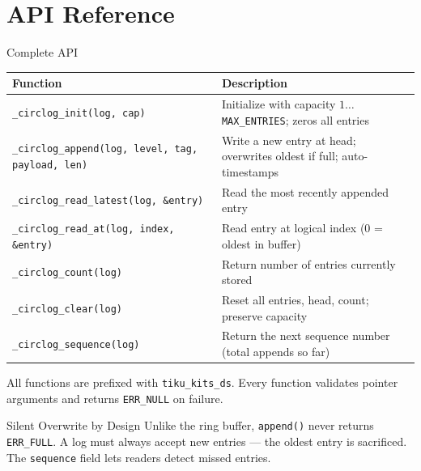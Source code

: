 \documentclass[aspectratio=169, 10pt]{beamer}
\begin{document}
\section{API Reference}

\begin{frame}[fragile]{Complete API}
\begin{table}
\centering
\small
\begin{tabular}{@{}lp{7.5cm}@{}}
\toprule
\textbf{Function} & \textbf{Description} \\
\midrule
\texttt{\_circlog\_init(log, cap)}
  & Initialize with capacity $1 \ldots$ \texttt{MAX\_ENTRIES}; zeros all entries \\
\midrule
\texttt{\_circlog\_append(log, level, tag, payload, len)}
  & Write a new entry at head; overwrites oldest if full; auto-timestamps \\
\midrule
\texttt{\_circlog\_read\_latest(log, \&entry)}
  & Read the most recently appended entry \\
\texttt{\_circlog\_read\_at(log, index, \&entry)}
  & Read entry at logical index (0 = oldest in buffer) \\
\midrule
\texttt{\_circlog\_count(log)}
  & Return number of entries currently stored \\
\texttt{\_circlog\_clear(log)}
  & Reset all entries, head, count; preserve capacity \\
\texttt{\_circlog\_sequence(log)}
  & Return the next sequence number (total appends so far) \\
\bottomrule
\end{tabular}
\end{table}

\vspace{0.3em}
{\scriptsize All functions are prefixed with \texttt{tiku\_kits\_ds}.
Every function validates pointer arguments and returns \texttt{ERR\_NULL} on failure.}

\begin{alertblock}{Silent Overwrite by Design}
Unlike the ring buffer, \texttt{append()} never returns \texttt{ERR\_FULL}.
A log must always accept new entries --- the oldest entry is sacrificed.
The \texttt{sequence} field lets readers detect missed entries.
\end{alertblock}
\end{frame}

\end{document}
